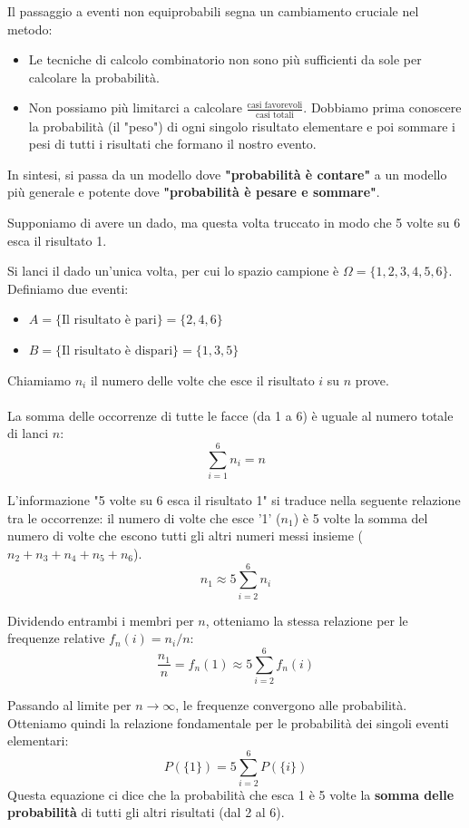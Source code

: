 Il passaggio a eventi non equiprobabili segna un cambiamento cruciale nel metodo:
\begin{itemize}
    \item Le tecniche di calcolo combinatorio non sono più sufficienti da sole per calcolare la probabilità.
    \item Non possiamo più limitarci a calcolare \(\frac{\text{casi favorevoli}}{\text{casi totali}}\). Dobbiamo prima conoscere la probabilità (il "peso") di ogni singolo risultato elementare e poi sommare i pesi di tutti i risultati che formano il nostro evento.
\end{itemize}
In sintesi, si passa da un modello dove \textbf{"probabilità è contare"} a un modello più generale e potente dove \textbf{"probabilità è pesare e sommare"}.


\begin{esempio}

Supponiamo di avere un dado, ma questa volta truccato in modo che 5 volte su 6 esca il risultato 1.

Si lanci il dado un’unica volta, per cui lo spazio campione è \(\Omega = \{1, 2, 3, 4, 5, 6\}\).
Definiamo due eventi:
\begin{itemize}
    \item \(A = \{\text{Il risultato è pari}\} = \{2, 4, 6\}\)
    \item \(B = \{\text{Il risultato è dispari}\} = \{1, 3, 5\}\)
\end{itemize}

Chiamiamo \(n_i\) il numero delle volte che esce il risultato \(i\) su \(n\) prove.
\\\\La somma delle occorrenze di tutte le facce (da 1 a 6) è uguale al numero totale di lanci \(n\):
\[ \sum_{i=1}^{6} n_i = n \]

L'informazione "5 volte su 6 esca il risultato 1" si traduce nella seguente relazione tra le occorrenze: il numero di volte che esce '1' (\(n_1\)) è 5 volte la somma del numero di volte che escono tutti gli altri numeri messi insieme (\(n_2 + n_3 + n_4 + n_5 + n_6\)).
\[ n_1 \approx 5 \sum_{i=2}^{6} n_i \]

Dividendo entrambi i membri per \(n\), otteniamo la stessa relazione per le frequenze relative \(f_n(i) = n_i/n\):
\[ \frac{n_1}{n} = f_n(1) \approx 5 \sum_{i=2}^{6} f_n(i) \]

Passando al limite per \(n \to \infty\), le frequenze convergono alle probabilità. Otteniamo quindi la relazione fondamentale per le probabilità dei singoli eventi elementari:
\[ P(\{1\}) = 5 \sum_{i=2}^{6} P(\{i\}) \]
Questa equazione ci dice che la probabilità che esca 1 è 5 volte la \textbf{somma delle probabilità} di tutti gli altri risultati (dal 2 al 6).


\end{esempio}
